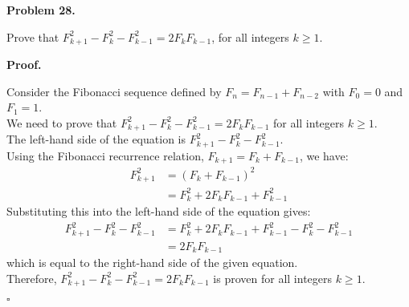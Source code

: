 \documentclass{article}
\newenvironment{problem}[1]{
    \begin{mdframed}[backgroundcolor=gray!20, skipabove=\baselineskip, skipbelow=\baselineskip, nobreak=true, innerleftmargin=10pt, innerrightmargin=10pt, innertopmargin=10pt, innerbottommargin=10pt]
    \textbf{Problem #1.}
}{
    \end{mdframed}
}
\newenvironment{proof}{
    \begin{mdframed}[nobreak=false, innerleftmargin=10pt, innerrightmargin=10pt, innertopmargin=10pt, innerbottommargin=10pt]
    \textbf{Proof.}
}{
    \hfill $\square$
    \end{mdframed}
}
\begin{document}
    \begin{problem}{28}
        Prove that $F_{k+1}^2 - F_k^2 - F_{k-1}^2 = 2F_k F_{k-1}$, for all integers $k \geq 1$.
    \end{problem}
    \begin{proof}
        Consider the Fibonacci sequence defined by $F_n = F_{n-1} + F_{n-2}$ with $F_0 = 0$ and $F_1 = 1$. \\
        We need to prove that $F_{k+1}^2 - F_k^2 - F_{k-1}^2 = 2F_k F_{k-1}$ for all integers $k \geq 1$. \\
        The left-hand side of the equation is $F_{k+1}^2 - F_k^2 - F_{k-1}^2$. \\
        Using the Fibonacci recurrence relation, $F_{k+1} = F_k + F_{k-1}$, we have:
        \begin{align*}
        F_{k+1}^2 &= (F_k + F_{k-1})^2 \\
                  &= F_k^2 + 2F_k F_{k-1} + F_{k-1}^2
        \end{align*}
        Substituting this into the left-hand side of the equation gives:
        \begin{align*}
        F_{k+1}^2 - F_k^2 - F_{k-1}^2 &= F_k^2 + 2F_k F_{k-1} + F_{k-1}^2 - F_k^2 - F_{k-1}^2 \\
        &= 2F_k F_{k-1}
        \end{align*}
        which is equal to the right-hand side of the given equation. \\
        Therefore, $F_{k+1}^2 - F_k^2 - F_{k-1}^2 = 2F_k F_{k-1}$ is proven for all integers $k \geq 1$.
    \end{proof}
\end{document}
